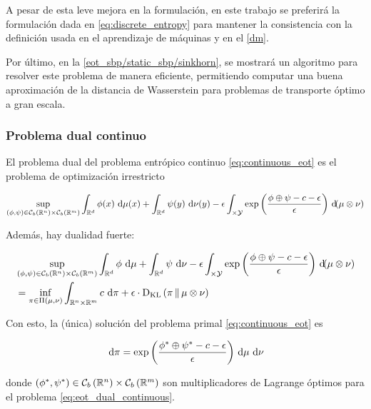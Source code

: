 
A pesar de esta leve mejora en la formulación, en este trabajo se preferirá la formulación dada en \eqref{eq:discrete_entropy} para mantener la consistencia con la definición usada en el aprendizaje de máquinas y en el \autoref{dm}.

Por último, en la \autoref{eot_sbp/static_sbp/sinkhorn}, se mostrará un algoritmo para resolver este problema de manera eficiente, permitiendo computar una buena aproximación de la distancia de Wasserstein para problemas de transporte óptimo a gran escala.

\subsubsection{Problema dual continuo}

\begin{prop}
	El problema dual del problema entrópico continuo \eqref{eq:continuous_eot} es el problema de optimización irrestricto

	\begin{equation}
		\label{eq:eot_dual_continuous}
		\sup_{(\phi,\psi)\in \mathcal{C}_b\left(\mathbb{R}^n\right)\times \mathcal{C}_b\left(\mathbb{R}^m\right)}
		\int_{\mathbb{R}^d} \phi(x) \,\operatorname{d}\!\mu(x) + \int_{\mathbb{R}^d} \psi(y) \,\operatorname{d}\!\nu(y)
		- \epsilon \int_{\times\mathcal{Y}} \exp\left(\frac{\phi\oplus\psi - c - \epsilon}{\epsilon}\right) \,\operatorname{d}\!(\mu\otimes\nu)
	\end{equation}

	Además, hay dualidad fuerte:

	\begin{align}
		 & \sup_{(\phi,\psi)\in \mathcal{C}_b\left(\mathbb{R}^n\right)\times \mathcal{C}_b\left(\mathbb{R}^m\right)}
		\int_{\mathbb{R}^d} \phi \,\operatorname{d}\!\mu + \int_{\mathbb{R}^d} \psi \,\operatorname{d}\!\nu
		- \epsilon \int_{\times\mathcal{Y}} \exp\left(\frac{\phi\oplus\psi - c - \epsilon}{\epsilon}\right) \,\operatorname{d}\!(\mu\otimes\nu) \\
		 & =\inf_{\pi\in\Pi(\mu,\nu)}  \int_{\mathbb{R}^n\times\mathbb{R}^m} c \,\operatorname{d}\!\pi + \epsilon\cdot \operatorname{D_{KL}}\left(\pi\,\|\,\mu\otimes\nu\right)
	\end{align}

	Con esto, la (única) solución del problema primal \eqref{eq:continuous_eot} es

	\begin{equation}
		\,\operatorname{d}\!\pi = \exp\left(\frac{\phi^* \oplus \psi^* - c - \epsilon}{\epsilon}\right) \,\operatorname{d}\!\mu\,\operatorname{d}\!\nu
	\end{equation}

	donde $(\phi^*,\psi^*)\in \mathcal{C}_b\left(\mathbb{R}^n\right)\times \mathcal{C}_b\left(\mathbb{R}^m\right)$ son multiplicadores de Lagrange óptimos para el problema \eqref{eq:eot_dual_continuous}.
\end{prop}

